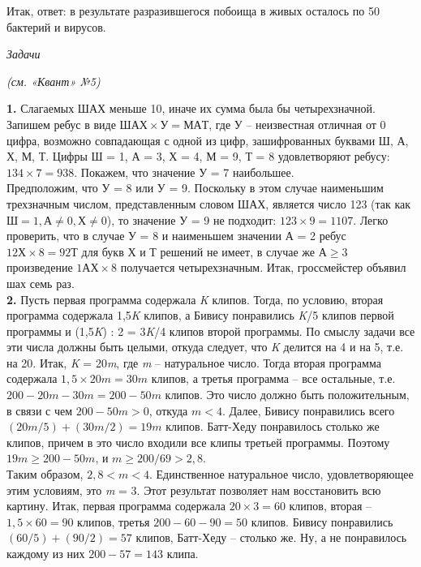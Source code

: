 \begin{multicols}{2}
    Итак, ответ: в результате разразившегося побоища в живых осталось по 50 бактерий и вирусов.
    \begin{center}
        \large
        \emph{Задачи}\\
    \end{center}
    \begin{center}
        \emph{(см. «Квант» №5)}
    \end{center}
    \textbf{1.} Слагаемых ШАХ меньше 10, иначе их сумма была бы четырехзначной. Запишем ребус в виде $ШАХ \times У = МАТ$, где У – неизвестная отличная от 0 цифра, возможно совпадающая с одной из цифр, зашифрованных буквами Ш, А, Х, М, Т. Цифры Ш = 1, А = 3, Х = 4, М = 9, Т = 8 удовлетворяют ребусу: $134 \times 7 = 938$. Покажем, что значение У = 7 наибольшее. \\ 
    Предположим, что У = 8 или У = 9. Поскольку в этом случае наименьшим трехзначным числом, представленным словом ШАХ, является число 123 (так как $Ш = 1, А \neq 0, Х \neq 0$), то значение У = 9 не подходит: $123 \times 9 = 1107$. Легко проверить, что в случае У = 8 и наименьшем значении А = 2 ребус $12Х \times 8 = 92Т$ для букв Х и Т решений не имеет, в случае же $А \geq 3$ произведение $1АХ \times 8$ получается четырехзначным. Итак, гроссмейстер объявил шах семь раз. \\ 
    \textbf{2.} Пусть первая программа содержала \emph{K} клипов. Тогда, по условию, вторая программа содержала 1,5\emph{K} клипов, а Бивису понравились \emph{K}/5 клипов первой программы и (1,5\emph{K}) : 2 = 3\emph{K}/4 клипов второй программы. По смыслу задачи все эти числа должны быть целыми, откуда следует, что \emph{K} делится на 4 и на 5, т.е. на 20. Итак, \emph{K} = 20\emph{m}, где \emph{m} – натуральное число. Тогда вторая программа содержала $1,5 \times 20m = 30m$ клипов, а третья программа – все остальные, т.е. $200 - 20m - 30m = 200 - 50m$ клипов. Это число должно быть положительным, в связи с чем $200 - 50m > 0$, откуда $m < 4$. Далее, Бивису понравились всего  $(20m/5) + (30m/2) = 19m$ клипов. Батт-Хеду понравилось столько же клипов, причем в это число входили все клипы третьей программы. Поэтому $19m \geq 200 - 50m$, и $m \geq 200/69 > 2,8$.\\ 
    Таким образом, $2,8 < m < 4$. Единственное натуральное число, удовлетворяющее этим условиям, это \emph{m} = 3. Этот результат позволяет нам восстановить всю картину. Итак, первая программа содержала $20 \times 3 = 60$ клипов, вторая – $1,5 \times 60 =  90$ клипов, третья $200 - 60 - 90 = 50$ клипов. Бивису понравились $(60/5) + (90/2) = 57$ клипов, Батт-Хеду – столько же. Ну, а не понравилось каждому из них $200 - 57 = 143$ клипа. \\ 

\end{multicols}
